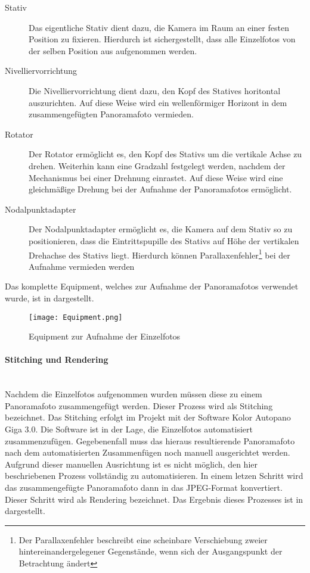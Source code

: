 \begin{description}
\item[Stativ] Das eigentliche Stativ dient dazu, die Kamera im Raum an einer
festen Position zu fixieren. Hierdurch ist sichergestellt, dass alle
Einzelfotos von der selben Position aus aufgenommen werden.
\item[Nivelliervorrichtung] Die Nivelliervorrichtung dient dazu, den Kopf des
Statives horitontal auszurichten. Auf diese Weise wird ein wellenförmiger
Horizont in dem zusammengefügten Panoramafoto vermieden.
\item[Rotator] Der Rotator ermöglicht es, den Kopf des Stativs um die vertikale
Achse zu drehen. Weiterhin kann eine Gradzahl festgelegt werden, nachdem der
Mechanismus bei einer Drehnung einrastet. Auf diese Weise wird eine gleichmäßige
Drehung bei der Aufnahme der Panoramafotos ermöglicht.
\item[Nodalpunktadapter] Der Nodalpunktadapter ermöglicht es, die Kamera auf
dem Stativ so zu positionieren, dass die Eintrittspupille des Stativs auf Höhe
der vertikalen Drehachse des Stativs liegt. Hierdurch können
Parallaxenfehler\footnote{Der Parallaxenfehler beschreibt eine scheinbare
Verschiebung zweier hintereinandergelegener Gegenstände, wenn sich der
Ausgangspunkt der Betrachtung ändert} bei der Aufnahme vermieden werden
\end{description}

Das komplette Equipment, welches zur Aufnahme der Panoramafotos verwendet wurde,
ist in  dargestellt.

\begin{figure}[htb]
\centering
\texttt{[image: Equipment.png]}
\caption[Equipment zur Aufnahme der Einzelfotos]{Equipment zur Aufnahme der Einzelfotos\protect\footnotemark}
\label{fig:Equipment}
\end{figure}

\clearpage

\paragraph{Stitching und Rendering} \hfill \\

Nachdem die Einzelfotos aufgenommen wurden müssen diese zu einem Panoramafoto
zusammengefügt werden. Dieser Prozess wird als Stitching bezeichnet. Das
Stitching erfolgt im Projekt mit der Software Kolor Autopano Giga 3.0. Die
Software ist in der Lage, die Einzelfotos automatisiert zusammenzufügen.
Gegebenenfall muss das hieraus resultierende Panoramafoto nach dem
automatisierten Zusammenfügen noch manuell ausgerichtet werden. Aufgrund
dieser manuellen Ausrichtung ist es nicht möglich, den hier beschriebenen
Prozess vollständig zu automatisieren. In einem letzen Schritt wird das
zusammengefügte Panoramafoto dann in das JPEG-Format konvertiert. Dieser Schritt
wird als Rendering bezeichnet. Das Ergebnis dieses Prozesses ist in
 dargestellt.

